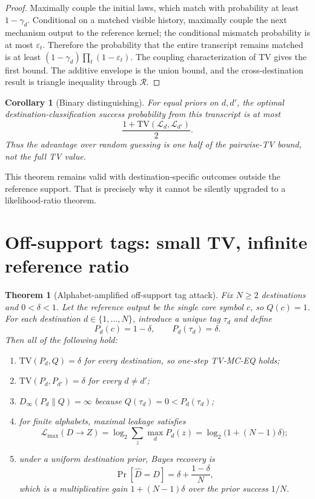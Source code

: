 \documentclass[11pt]{article}
\newtheorem{theorem}{Theorem}
\newtheorem{corollary}{Corollary}
\newcommand{\TV}{\mathrm{TV}}
\newcommand{\Dinf}{D_{\infty}}
\newcommand{\ML}{\mathcal{L}_{\max}}
\begin{document}
\begin{proof}
Maximally couple the initial laws, which match with probability at least $1-\gamma_d$.  Conditional on a matched visible history, maximally couple the next mechanism output to the reference kernel; the conditional mismatch probability is at most $\varepsilon_t$.  Therefore the probability that the entire transcript remains matched is at least $(1-\gamma_d)\prod_t(1-\varepsilon_t)$.  The coupling characterization of TV gives the first bound.  The additive envelope is the union bound, and the cross-destination result is triangle inequality through $\mathcal R$.
\end{proof}

\begin{corollary}[Binary distinguishing]
For equal priors on $d,d'$, the optimal destination-classification success probability from this transcript is at most
\[
\frac{1+\TV(\mathcal L_d,\mathcal L_{d'})}{2}.
\]
Thus the advantage over random guessing is one half of the pairwise-TV bound, not the full TV value.
\end{corollary}

This theorem remains valid with destination-specific outcomes outside the reference support.  That is precisely why it cannot be silently upgraded to a likelihood-ratio theorem.

\section{Off-support tags: small TV, infinite reference ratio}
\begin{theorem}[Alphabet-amplified off-support tag attack]
Fix $N\ge2$ destinations and $0<\delta<1$.  Let the reference output be the single core symbol $c$, so $Q(c)=1$.  For each destination $d\in\{1,\ldots,N\}$, introduce a unique tag $\tau_d$ and define
\[
P_d(c)=1-\delta,\qquad P_d(\tau_d)=\delta.
\]
Then all of the following hold:
\begin{enumerate}[leftmargin=1.5em]
\item $\TV(P_d,Q)=\delta$ for every destination, so one-step TV-MC-EQ holds;
\item $\TV(P_d,P_{d'})=\delta$ for every $d\ne d'$;
\item $\Dinf(P_d\|Q)=\infty$ because $Q(\tau_d)=0<P_d(\tau_d)$;
\item for finite alphabets, maximal leakage satisfies
\[
\ML(D\!\to\! Z)=\log_2\sum_z\max_d P_d(z)
=\log_2\!\bigl(1+(N-1)\delta\bigr);
\]
\item under a uniform destination prior, Bayes recovery is
\[
\Pr[\widehat D=D]=\delta+\frac{1-\delta}{N},
\]
which is a multiplicative gain $1+(N-1)\delta$ over the prior success $1/N$.
\end{enumerate}
\end{theorem}
\end{document}

